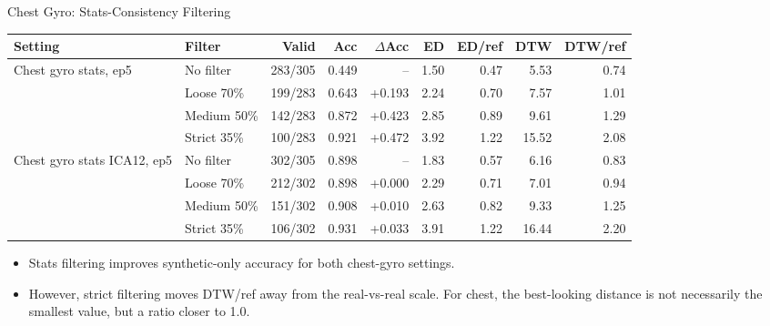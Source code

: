 \begin{frame}{Chest Gyro: Stats-Consistency Filtering}
\scriptsize
\begin{adjustbox}{max width=\textwidth}
\begin{tabular}{llrrrrrrr}
\toprule
Setting & Filter & Valid & Acc & $\Delta$Acc & ED & ED/ref & DTW & DTW/ref \\
\midrule
Chest gyro stats, ep5 & No filter & 283/305 & 0.449 & -- & 1.50 & 0.47 & 5.53 & 0.74 \\
 & Loose 70\% & 199/283 & 0.643 & +0.193 & 2.24 & 0.70 & 7.57 & 1.01 \\
 & Medium 50\% & 142/283 & 0.872 & +0.423 & 2.85 & 0.89 & 9.61 & 1.29 \\
 & Strict 35\% & 100/283 & 0.921 & +0.472 & 3.92 & 1.22 & 15.52 & 2.08 \\
\addlinespace
Chest gyro stats ICA12, ep5 & No filter & 302/305 & 0.898 & -- & 1.83 & 0.57 & 6.16 & 0.83 \\
 & Loose 70\% & 212/302 & 0.898 & +0.000 & 2.29 & 0.71 & 7.01 & 0.94 \\
 & Medium 50\% & 151/302 & 0.908 & +0.010 & 2.63 & 0.82 & 9.33 & 1.25 \\
 & Strict 35\% & 106/302 & 0.931 & +0.033 & 3.91 & 1.22 & 16.44 & 2.20 \\
\bottomrule
\end{tabular}
\end{adjustbox}
\vspace{0.4em}
\begin{itemize}
  \item Stats filtering improves synthetic-only accuracy for both chest-gyro settings.
  \item However, strict filtering moves DTW/ref away from the real-vs-real scale. For chest, the best-looking distance is not necessarily the smallest value, but a ratio closer to 1.0.
\end{itemize}
\end{frame}

